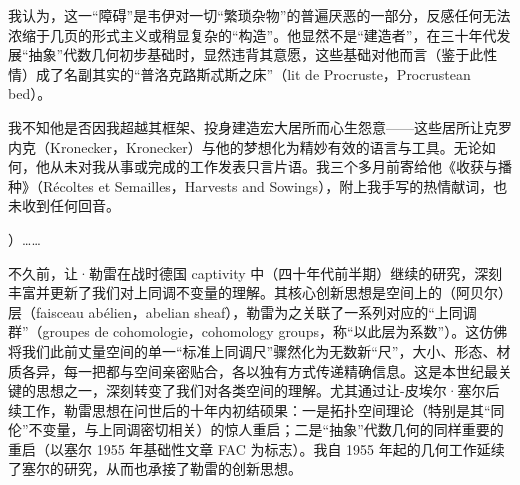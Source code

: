 {我认为，这一“障碍”是韦伊对一切“繁琐杂物”的普遍厌恶的一部分，反感任何无法浓缩于几页的形式主义或稍显复杂的“构造”。他显然不是“建造者”，在三十年代发展“抽象”代数几何初步基础时，显然违背其意愿，这些基础对他而言（鉴于此性情）成了名副其实的“普洛克路斯忒斯之床”（lit de Procruste，Procrustean bed）。

我不知他是否因我超越其框架、投身建造宏大居所而心生怨意——这些居所让克罗内克（Kronecker，Kronecker）与他的梦想化为精妙有效的语言与工具。无论如何，他从未对我从事或完成的工作发表只言片语。我三个多月前寄给他《收获与播种》（Récoltes et Semailles，Harvests and Sowings），附上我手写的热情献词，也未收到任何回音。}）……

不久前，让·勒雷在战时德国 captivity 中（四十年代前半期）继续的研究，深刻丰富并更新了我们对上同调不变量的理解。其核心创新思想是空间上的（阿贝尔）层（faisceau abélien，abelian sheaf），勒雷为之关联了一系列对应的“上同调群”（groupes de cohomologie，cohomology groups，称“以此层为系数”）。这仿佛将我们此前丈量空间的单一“标准上同调尺”骤然化为无数新“尺”，大小、形态、材质各异，每一把都与空间亲密贴合，各以独有方式传递精确信息。这是本世纪最关键的思想之一，深刻转变了我们对各类空间的理解。尤其通过让-皮埃尔·塞尔后续工作，勒雷思想在问世后的十年内初结硕果：一是拓扑空间理论（特别是其“同伦”不变量，与上同调密切相关）的惊人重启；二是“抽象”代数几何的同样重要的重启（以塞尔 1955 年基础性文章 FAC 为标志）。我自 1955 年起的几何工作延续了塞尔的研究，从而也承接了勒雷的创新思想。